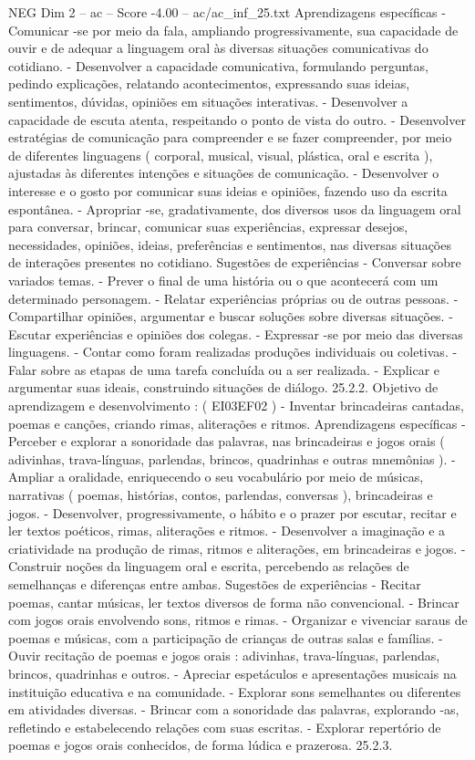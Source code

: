 \begin{textsample}{NEG Dim 2 – ac – Score -4.00 – ac/ac\_inf\_25.txt}
Aprendizagens específicas - Comunicar -se por meio da fala, ampliando progressivamente, sua capacidade de ouvir e de adequar a linguagem oral às diversas situações comunicativas do cotidiano. - Desenvolver a capacidade comunicativa, formulando perguntas, pedindo explicações, relatando acontecimentos, expressando suas ideias, sentimentos, dúvidas, opiniões em situações interativas. - Desenvolver a capacidade de escuta atenta, respeitando o ponto de vista do outro. - Desenvolver estratégias de comunicação para compreender e se fazer compreender, por meio de diferentes linguagens ( corporal, musical, visual, plástica, oral e escrita ), ajustadas às diferentes intenções e situações de comunicação. - Desenvolver o interesse e o gosto por comunicar suas ideias e opiniões, fazendo uso da escrita espontânea. - Apropriar -se, gradativamente, dos diversos usos da linguagem oral para conversar, brincar, comunicar suas experiências, expressar desejos, necessidades, opiniões, ideias, preferências e sentimentos, nas diversas situações de interações presentes no cotidiano.
Sugestões de experiências - Conversar sobre variados temas. - Prever o final de uma história ou o que acontecerá com um determinado personagem. - Relatar experiências próprias ou de outras pessoas. - Compartilhar opiniões, argumentar e buscar soluções sobre diversas situações. - Escutar experiências e opiniões dos colegas. - Expressar -se por meio das diversas linguagens. - Contar como foram realizadas produções individuais ou coletivas. - Falar sobre as etapas de uma tarefa concluída ou a ser realizada. - Explicar e argumentar suas ideais, construindo situações de diálogo. 25.2.2.
Objetivo de aprendizagem e desenvolvimento : ( EI03EF02 ) - Inventar brincadeiras cantadas, poemas e canções, criando rimas, aliterações e ritmos.
Aprendizagens específicas - Perceber e explorar a sonoridade das palavras, nas brincadeiras e jogos orais ( adivinhas, trava-línguas, parlendas, brincos, quadrinhas e outras mnemônias ). - Ampliar a oralidade, enriquecendo o seu vocabulário por meio de músicas, narrativas ( poemas, histórias, contos, parlendas, conversas ), brincadeiras e jogos. - Desenvolver, progressivamente, o hábito e o prazer por escutar, recitar e ler textos poéticos, rimas, aliterações e ritmos. - Desenvolver a imaginação e a criatividade na produção de rimas, ritmos e aliterações, em brincadeiras e jogos. - Construir noções da linguagem oral e escrita, percebendo as relações de semelhanças e diferenças entre ambas.
Sugestões de experiências - Recitar poemas, cantar músicas, ler textos diversos de forma não convencional. - Brincar com jogos orais envolvendo sons, ritmos e rimas. - Organizar e vivenciar saraus de poemas e músicas, com a participação de crianças de outras salas e famílias. - Ouvir recitação de poemas e jogos orais : adivinhas, trava-línguas, parlendas, brincos, quadrinhas e outros. - Apreciar espetáculos e apresentações musicais na instituição educativa e na comunidade. - Explorar sons semelhantes ou diferentes em atividades diversas. - Brincar com a sonoridade das palavras, explorando -as, refletindo e estabelecendo relações com suas escritas. - Explorar repertório de poemas e jogos orais conhecidos, de forma lúdica e prazerosa. 25.2.3.

\end{textsample}
